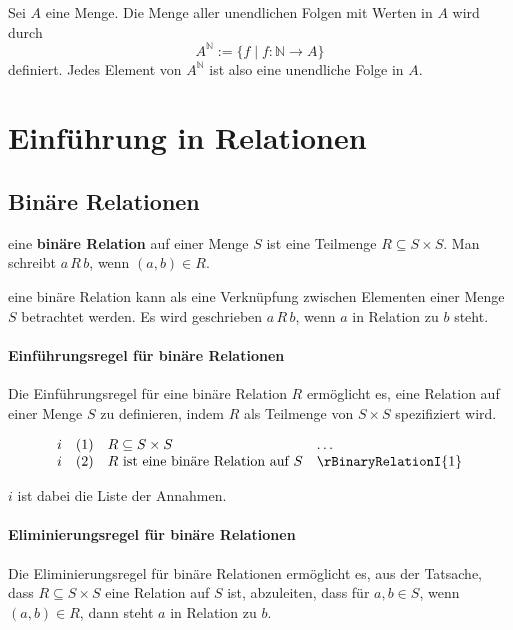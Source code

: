 \documentclass[main.tex]{subfiles}
\begin{document}
\begin{definition}
    Sei \(A\) eine Menge. Die Menge aller unendlichen Folgen mit Werten in \(A\) wird durch
    \[
    A^{\mathbb{N}} := \{f \mid f: \mathbb{N} \to A\}
    \]
    definiert. Jedes Element von \(A^{\mathbb{N}}\) ist also eine unendliche Folge in \(A\).
\end{definition}


\chapter{Einführung in Relationen}

\section{Binäre Relationen}

\begin{definition}
    eine \textbf{binäre Relation} auf einer Menge \(S\) ist eine Teilmenge \(R \subseteq S \times S\). Man schreibt \(a \, R \, b\), wenn \((a,b) \in R\).
\end{definition}

\begin{remark}
    eine binäre Relation kann als eine Verknüpfung zwischen Elementen einer Menge \(S\) betrachtet werden. Es wird geschrieben \(a \, R \, b\), wenn \(a\) in Relation zu \(b\) steht.
\end{remark}

\subsubsection*{Einführungsregel für binäre Relationen}
\label{rule:rBinaryRelationI}
Die Einführungsregel für eine binäre Relation \(R\) ermöglicht es, eine Relation auf einer Menge \(S\) zu definieren, indem \(R\) als Teilmenge von \(S \times S\) spezifiziert wird.

\[
\begin{array}{llll}
    i       & (1) & R \subseteq S \times S & \dots \\
    i       & (2) & R \text{ ist eine binäre Relation auf } S & \rBinaryRelationI{1}
\end{array}
\]

\(i\) ist dabei die Liste der Annahmen.

\subsubsection*{Eliminierungsregel für binäre Relationen}
\label{rule:rBinaryRelationE}
Die Eliminierungsregel für binäre Relationen ermöglicht es, aus der Tatsache, dass \(R \subseteq S \times S\) eine Relation auf \(S\) ist, abzuleiten, dass für \(a, b \in S\), wenn \((a,b) \in R\), dann steht \(a\) in Relation zu \(b\).
\end{document}
